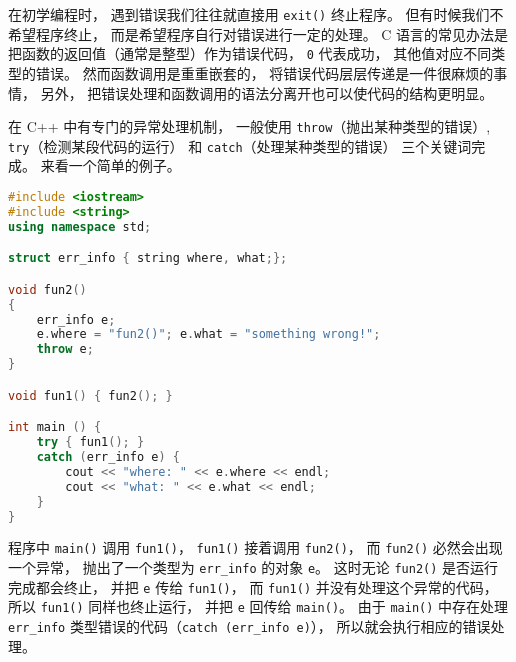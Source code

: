 
\begin{issues}
\issueDraft
\end{issues}

在初学编程时， 遇到错误我们往往就直接用 \verb|exit()| 终止程序。 但有时候我们不希望程序终止， 而是希望程序自行对错误进行一定的处理。 C 语言的常见办法是把函数的返回值（通常是整型）作为错误代码， \verb|0| 代表成功， 其他值对应不同类型的错误。 然而函数调用是重重嵌套的， 将错误代码层层传递是一件很麻烦的事情， 另外， 把错误处理和函数调用的语法分离开也可以使代码的结构更明显。

在 C++ 中有专门的异常处理机制， 一般使用 \verb|throw|（抛出某种类型的错误）, \verb|try|（检测某段代码的运行） 和 \verb|catch|（处理某种类型的错误） 三个关键词完成。 来看一个简单的例子。

\begin{lstlisting}[language=cpp]
#include <iostream>
#include <string>
using namespace std;

struct err_info { string where, what;};

void fun2()
{
	err_info e;
	e.where = "fun2()"; e.what = "something wrong!";
	throw e;
}

void fun1() { fun2(); }

int main () {
	try { fun1(); }
	catch (err_info e) {
		cout << "where: " << e.where << endl;
		cout << "what: " << e.what << endl; 
	}
}
\end{lstlisting}
程序中 \verb|main()| 调用 \verb|fun1()|， \verb|fun1()| 接着调用 \verb|fun2()|， 而 \verb|fun2()| 必然会出现一个异常， 抛出了一个类型为 \verb|err_info| 的对象 \verb|e|。 这时无论 \verb|fun2()| 是否运行完成都会终止， 并把 \verb|e| 传给 \verb|fun1()|， 而 \verb|fun1()| 并没有处理这个异常的代码， 所以 \verb|fun1()| 同样也终止运行， 并把 \verb|e| 回传给 \verb|main()|。 由于 \verb|main()| 中存在处理 \verb|err_info| 类型错误的代码（\verb|catch (err_info e)|）， 所以就会执行相应的错误处理。
